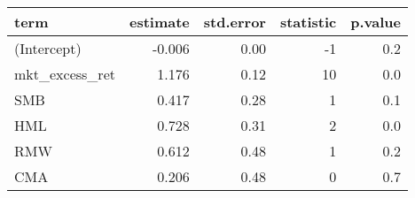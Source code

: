 \begin{table}[ht]
\centering
\begin{tabular}{lrrrr}
  \hline
term & estimate & std.error & statistic & p.value \\ 
  \hline
(Intercept) & -0.006 & 0.00 & -1 & 0.2 \\ 
  mkt\_excess\_ret & 1.176 & 0.12 & 10 & 0.0 \\ 
  SMB & 0.417 & 0.28 & 1 & 0.1 \\ 
  HML & 0.728 & 0.31 & 2 & 0.0 \\ 
  RMW & 0.612 & 0.48 & 1 & 0.2 \\ 
  CMA & 0.206 & 0.48 & 0 & 0.7 \\ 
   \hline
\end{tabular}
\end{table}

